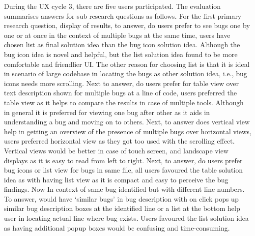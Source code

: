 During the UX cycle 3, there are five users participated. The evaluation summarises answers for sub research questions as follows. For the first primary research question, display of results, to answer, do users prefer to see bugs one by one or at once in the context of multiple bugs at the same time,  users have chosen list as final solution idea than the bug icon solution idea. Although the bug icon idea is novel and helpful, but the list solution idea found to be more comfortable and friendlier UI. The other reason for choosing list is that it is ideal in scenario of large codebase in locating the bugs as other solution idea, i.e., bug icons needs more scrolling. Next to answer, do users prefer for table view over text description shown for multiple bugs at a line of code, users preferred the table view as it helps to compare the results in case of multiple tools. Although in general it is preferred for viewing one bug after other as it aids in understanding a bug and moving on to others. Next, to answer does vertical view help in getting an overview of the presence of multiple bugs over horizontal views, users preferred horizontal view as they got too used with the scrolling effect. Vertical views would be better in case of touch screen, and landscape view displays as it is easy to read from left to right. Next, to answer, do users prefer bug icons or list view for bugs in same file, all users favoured the table solution idea as with having list view as it is compact and easy to perceive the bug findings. Now In context of same bug identified but with different line numbers. To answer, would have ‘similar bugs’ in bug description with on click pops up similar bug description boxes at the identified line or a list at the bottom help user in locating actual line where bug exists. Users favoured the list solution idea as having additional popup boxes would be confusing and time-consuming. \\

